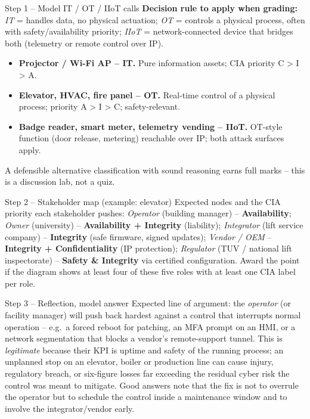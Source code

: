 \documentclass[11pt,a4paper]{article}
\begin{document}
\begin{solutionbox}{Step 1 -- Model IT / OT / IIoT calls}
\textbf{Decision rule to apply when grading:} \emph{IT} = handles data,
no physical actuation; \emph{OT} = controls a physical process, often
with safety/availability priority; \emph{IIoT} = network-connected
device that bridges both (telemetry or remote control over IP).
\begin{itemize}\setlength{\itemsep}{1pt}
  \item \textbf{Projector / Wi-Fi AP -- IT.} Pure information assets; CIA priority C > I > A.
  \item \textbf{Elevator, HVAC, fire panel -- OT.} Real-time control of a physical process; priority A > I > C; safety-relevant.
  \item \textbf{Badge reader, smart meter, telemetry vending -- IIoT.} OT-style function (door release, metering) reachable over IP; both attack surfaces apply.
\end{itemize}
A defensible alternative classification with sound reasoning earns
full marks -- this is a discussion lab, not a quiz.
\end{solutionbox}

\begin{solutionbox}{Step 2 -- Stakeholder map (example: elevator)}
Expected nodes and the CIA priority each stakeholder pushes:
\emph{Operator} (building manager) -- \textbf{Availability};
\emph{Owner} (university) -- \textbf{Availability + Integrity} (liability);
\emph{Integrator} (lift service company) -- \textbf{Integrity} (safe firmware, signed updates);
\emph{Vendor / OEM} -- \textbf{Integrity + Confidentiality} (IP protection);
\emph{Regulator} (TUV / national lift inspectorate) -- \textbf{Safety \& Integrity} via certified configuration.
Award the point if the diagram shows at least four of these five roles with at least one CIA label per role.
\end{solutionbox}

\begin{solutionbox}{Step 3 -- Reflection, model answer}
Expected line of argument: the \emph{operator} (or facility manager)
will push back hardest against a control that interrupts normal
operation -- e.g.\ a forced reboot for patching, an MFA prompt on an
HMI, or a network segmentation that blocks a vendor's remote-support
tunnel. This is \emph{legitimate} because their KPI is uptime and
safety of the running process; an unplanned stop on an elevator,
boiler or production line can cause injury, regulatory breach, or
six-figure losses far exceeding the residual cyber risk the control
was meant to mitigate. Good answers note that the fix is not to
overrule the operator but to schedule the control inside a maintenance
window and to involve the integrator/vendor early.
\end{solutionbox}
\end{document}
